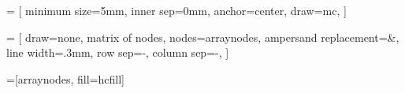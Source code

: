 \usepackage{textcomp}
\usepackage[dvipsnames]{xcolor}
\usepackage{amsopn, amsmath, amssymb}
\usepackage{booktabs}

\newcommand{\myproc}[1]{\text{\textsc{\text{#1}}}}
\newcommand{\myvar}[1]{\text{\sl #1}}

\usepackage{tikz}
\usepackage{tikz-qtree}
\usepackage{pgfplots}

\usetikzlibrary{
	positioning, 
	matrix, 
	calc,
	arrows,
	shapes,
	fit,
	decorations,
	decorations.pathmorphing
}


 = [
	minimum size=5mm, 
	inner sep=0mm,
	anchor=center,
	draw=mc,
]

 = [
	draw=none,
	matrix of nodes,
	nodes={arraynodes},
	ampersand replacement=\&,
	line width=.3mm,
	row sep=-\pgflinewidth,
	column sep=-\pgflinewidth,
]

=[arraynodes, fill=hcfill]

\newcommand{\logo}{
	\path[use as bounding box] (-2.6, -2.6) rectangle (2.6, 2.6);
	\draw[rounded corners] (-2.5, -2.5) rectangle (2.5, 2.5);
}

\newenvironment{pseudocode}
	{\hrule\medskip}
	{\medskip\hrule}